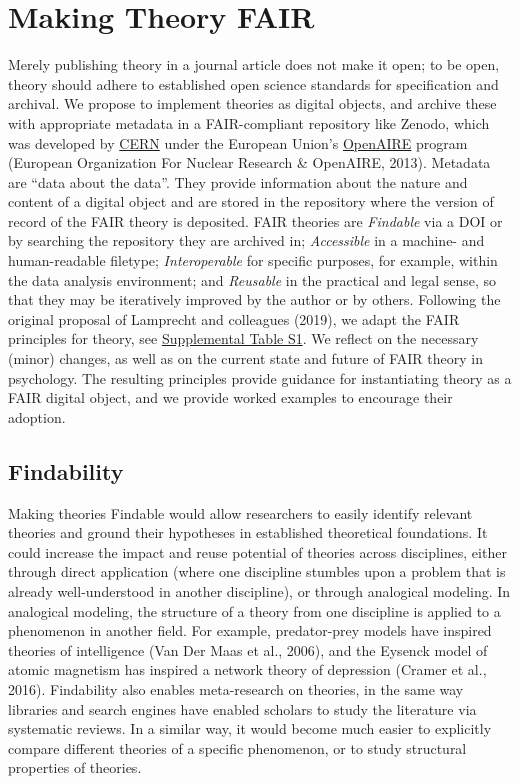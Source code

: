 \documentclass[
  man, noextraspace,floatsintext]{apa7}
\begin{document}
\section{Making Theory FAIR}\label{making-theory-fair}

Merely publishing theory in a journal article does not make it open;
to be open, theory should adhere to established open science standards for specification and archival.
We propose to implement theories as digital objects,
and archive these with appropriate metadata in a FAIR-compliant repository like Zenodo,
which was developed by \href{https://home.cern/}{CERN} under the European Union's \href{https://www.openaire.eu/}{OpenAIRE} program (European Organization For Nuclear Research \& OpenAIRE, 2013).
Metadata are ``data about the data''.
They provide information about the nature and content of a digital object and are stored in the repository where the version of record of the FAIR theory is deposited.
FAIR theories are \emph{Findable} via a DOI or by searching the repository they are archived in;
\emph{Accessible} in a machine- and human-readable filetype;
\emph{Interoperable} for specific purposes, for example, within the data analysis environment;
and \emph{Reusable} in the practical and legal sense, so that they may be iteratively improved by the author or by others.
Following the original proposal of Lamprecht and colleagues (2019),
we adapt the FAIR principles for theory, see \href{https://github.com/cjvanlissa/fair_theory/blob/main/fair_principles.csv}{Supplemental Table S1}.
We reflect on the necessary (minor) changes,
as well as on the current state and future of FAIR theory in psychology.
The resulting principles provide guidance for instantiating theory as a FAIR digital object,
and we provide worked examples to encourage their adoption.

\subsection{Findability}\label{findability}

Making theories Findable would allow researchers to easily identify relevant theories
and ground their hypotheses in established theoretical foundations.
It could increase the impact and reuse potential of theories across disciplines,
either through direct application (where one discipline stumbles upon a problem that is already well-understood in another discipline),
or through analogical modeling.
In analogical modeling, the structure of a theory from one discipline is applied to a phenomenon in another field.
For example, predator-prey models have inspired theories of intelligence (Van Der Maas et al., 2006), and the Eysenck model of atomic magnetism has inspired a network theory of depression (Cramer et al., 2016).
Findability also enables meta-research on theories,
in the same way libraries and search engines have enabled scholars to study the literature via systematic reviews.
In a similar way, it would become much easier to explicitly compare different theories of a specific phenomenon,
or to study structural properties of theories.
\end{document}

